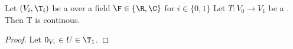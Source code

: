 \begin{prop}
\label{prop:boundedlinearoperatorsarecontinuous}
Let $(V_i,\T_i)$ be a \TVS over a field $\F \in \{\R, \C\}$ for $i \in \{0,1\}$
Let $T:V_0 \to V_1$ be a 
\BoundedLinearOperator. 
Then T is continous. 
\begin{proof} 
    Let $0_{V_1} \in U \in \T_1$. 
\end{proof} 
\end{prop}
